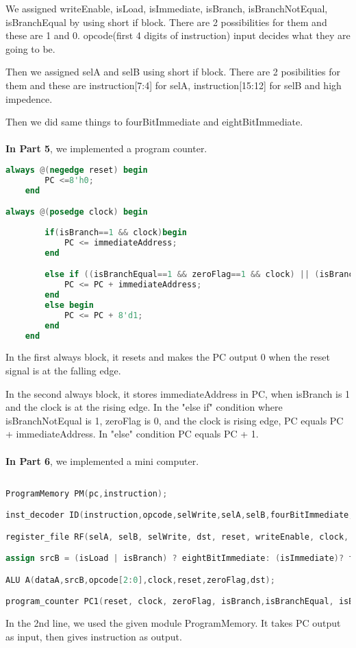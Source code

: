 \documentclass[pdftex,12pt,a4paper]{article}
\begin{document}
We assigned writeEnable, isLoad, isImmediate, isBranch, isBranchNotEqual, isBranchEqual by using short if block. There are 2 possibilities for them and these are 1 and 0. opcode(first 4 digits of instruction) input decides what they are going to be.

Then we assigned selA and selB using short if block. There are 2 posibilities for them and these are instruction[7:4] for selA, instruction[15:12] for selB and high impedence.

Then we did same things to fourBitImmediate and eightBitImmediate.\\
\\


\textbf{In Part 5}, we implemented a program counter.
\begin{lstlisting}[language=Verilog, caption=PC]
always @(negedge reset) begin
        PC <=8'h0;
    end

always @(posedge clock) begin
   
        if(isBranch==1 && clock)begin
            PC <= immediateAddress;
        end

        else if ((isBranchEqual==1 && zeroFlag==1 && clock) || (isBranchNotEqual==1 && zeroFlag==0 && clock))begin
            PC <= PC + immediateAddress; 
        end
        else begin
            PC <= PC + 8'd1;
        end
    end
\end{lstlisting}

In the first always block, it resets and makes the PC output 0 when the reset signal is at the falling edge.  

In the second always block, it stores immediateAddress in PC, when isBranch is 1 and the clock is at the rising edge. In the "else if" condition where isBranchNotEqual is 1, zeroFlag is 0, and the clock is rising edge, PC equals PC + immediateAddress.  In "else" condition PC equals PC + 1.\\
\\

\textbf{In Part 6}, we implemented a mini computer.
\begin{lstlisting}[language=Verilog, caption=Mini-Computer]

ProgramMemory PM(pc,instruction);

inst_decoder ID(instruction,opcode,selWrite,selA,selB,fourBitImmediate, eightBitImmediate,writeEnable,isLoad,isImmediate,isBranch,isBranchNotEqual,isBranchEqual);

register_file RF(selA, selB, selWrite, dst, reset, writeEnable, clock, dataA,dataB);

assign srcB = (isLoad | isBranch) ? eightBitImmediate: (isImmediate)? fourBitImmediate:((opcode == 4'd1) | (opcode == 4'd2) | (opcode == 4'd3) | (opcode == 4'd4) | (opcode == 4'd5) | (opcode == 4'd6) | (opcode == 4'd11))? dataB:4'bZ;

ALU A(dataA,srcB,opcode[2:0],clock,reset,zeroFlag,dst);

program_counter PC1(reset, clock, zeroFlag, isBranch,isBranchEqual, isBranchNotEqual, eightBitImmediate[8:0],PC);
\end{lstlisting}
In the 2nd line, we used the given module ProgramMemory. It takes PC output as input, then gives instruction as output. 
\end{document}
